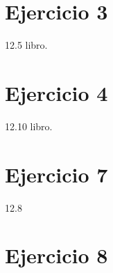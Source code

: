 \documentclass[10pt,a4paper,openright]{book}
\theoremstyle{break}
\begin{document}
\section{Ejercicio 3}%
\label{sec:ejercicio_3_5}
12.5 libro.

\section{Ejercicio 4}%
\label{sec:ejercicio_4_5}
12.10 libro.

\section{Ejercicio 7}%
\label{sec:ejercicio_7_5}
12.8

\section{Ejercicio 8}%
\label{sec:ejercicio_8_5}
\end{document}
